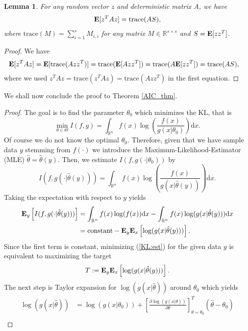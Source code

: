 \documentclass[a4paper, 12pt]{scrreprt}
\newtheorem{Lemma}[Theorem]{Lemma}
\newcommand{\RR}{\mathbb{R}}
\newcommand{\trace}{{\mathrm{trace}}}
\newcommand{\ew}{\mbox{\textbf{E}}}
\begin{document}
\begin{Lemma}\label{aic:lemma4} \upshape
For any random vector $z$ and deterministic matrix $A$, we have
 \[	\ew[z^T A z] = \trace(A S), \]
 where $\trace(M) = \sum_{i=1}^{s} M_{i,i}$ for any matrix $M \in \RR^{s \times s}$
 and $S = \ew[zz^T]$.
\end{Lemma}
\begin{proof} We have
\begin{align*}
\ew[z^T A z] &= \ew[ \trace(A zz^T)] = \trace( \ew[ A zz^T ] ) 
= \trace( A \ew[ zz^T ] ) =  \trace(A S),
\end{align*}
where we used $z^T A z = \trace(z^T A z) = \trace(A zz^T)$ in the first equation.
\end{proof}

We shall now conclude the proof to Theorem \ref{AIC_thm}.
\begin{proof}
The goal is to find the parameter $\theta_0$ which minimizes the KL, that is
\begin{equation}
\min_{\theta\in\Theta} I(f,g) = \int_{\RR^n} f(x) \log\left( \frac{f(x)}{g(x|\theta_0)} \right)\mathrm{d}x.
\end{equation}
Of course we do not know the optimal $\theta_0$. Therefore, given that we have sample data $y$ stemming from $f(\cdot)$ we introduce the Maximum-Likelihood-Estimator (MLE) $\hat{\theta} = \hat{\theta}(y)$.
Then, we estimate $I(f,g(\cdot|\theta_0))$ by
\begin{equation}\label{KL:est}
I(f,g(\cdot|\hat{\theta}(y))) = \int_{\RR^n} f(x) \log\left( \frac{f(x)}{g(x|\hat{\theta}(y))} \right)\mathrm{d}x.
\end{equation}
Taking the expectation with respect to $y$ yields
\begin{align*}
\ew_y\left[I(f,g(\cdot|\hat{\theta}(y)))\right] &= 
\int_{\RR^n} f(x) \log(f(x))\mathrm{d}x - \int_{\RR^n} f(x) \log(g(x|\hat{\theta}(y)))  \mathrm{d}x \\
&= \text{constant} - \ew_y \ew_x \left[ \log(g(x| \hat{\theta}(y))) \right].
\end{align*}
Since the first term is constant, minimizing (\ref{KL:est}) for the given data $y$ is equivalent to maximizing the target
\[ 
T := \ew_y \ew_x \left[ \log(g(x| \hat{\theta}(y))) \right].
\]
The next step is Taylor expansion for $\log(g(x|\hat{\theta}))$ around $\theta_0$ which yields
\begin{align*}
\log(g(x|\hat{\theta})) 
&= \log(g(x|\theta_0)) +  \left[ \frac{\partial \log(g(x|\theta))}{\partial \theta} \right]_{\theta = \theta_0}^T  (\hat{\theta} - \theta_0) \\

\end{align*}
\end{proof}
\end{document}
